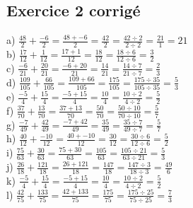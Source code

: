 \documentclass{article}
\begin{document}
\subsection*{Exercice 2 corrigé}
a) $\frac{48}{2}+\frac{-6}{2}=\frac{48+-6}{2}=\frac{42}{2}=\frac{42\div2}{2\div2}=\frac{21}{1}=21$\\ 
\vspace{10 mm}
b) $\frac{17}{12}+\frac{1}{12}=\frac{17+1}{12}=\frac{18}{12}=\frac{18\div6}{12\div6}=\frac{3}{2}$\\ 
\vspace{10 mm}
c) $\frac{-6}{21}+\frac{20}{21}=\frac{-6+20}{21}=\frac{14}{21}=\frac{14\div7}{21\div7}=\frac{2}{3}$\\ 
\vspace{10 mm}
d) $\frac{109}{105}+\frac{66}{105}=\frac{109+66}{105}=\frac{175}{105}=\frac{175\div35}{105\div35}=\frac{5}{3}$\\ 
\vspace{10 mm}
e) $\frac{-5}{4}+\frac{15}{4}=\frac{-5+15}{4}=\frac{10}{4}=\frac{10\div2}{4\div2}=\frac{5}{2}$\\ 
\vspace{10 mm}
f) $\frac{37}{70}+\frac{13}{70}=\frac{37+13}{70}=\frac{50}{70}=\frac{50\div10}{70\div10}=\frac{5}{7}$\\ 
\vspace{10 mm}
g) $\frac{-7}{49}+\frac{42}{49}=\frac{-7+42}{49}=\frac{35}{49}=\frac{35\div7}{49\div7}=\frac{5}{7}$\\ 
\vspace{10 mm}
h) $\frac{40}{12}+\frac{-10}{12}=\frac{40+-10}{12}=\frac{30}{12}=\frac{30\div6}{12\div6}=\frac{5}{2}$\\ 
\vspace{10 mm}
i) $\frac{75}{63}+\frac{30}{63}=\frac{75+30}{63}=\frac{105}{63}=\frac{105\div21}{63\div21}=\frac{5}{3}$\\ 
\vspace{10 mm}
j) $\frac{26}{18}+\frac{121}{18}=\frac{26+121}{18}=\frac{147}{18}=\frac{147\div3}{18\div3}=\frac{49}{6}$\\ 
\vspace{10 mm}
k) $\frac{-5}{4}+\frac{15}{4}=\frac{-5+15}{4}=\frac{10}{4}=\frac{10\div2}{4\div2}=\frac{5}{2}$\\ 
\vspace{10 mm}
l) $\frac{42}{75}+\frac{133}{75}=\frac{42+133}{75}=\frac{175}{75}=\frac{175\div25}{75\div25}=\frac{7}{3}$\\ 
\vspace{10 mm}
\newpage
\end{document}
